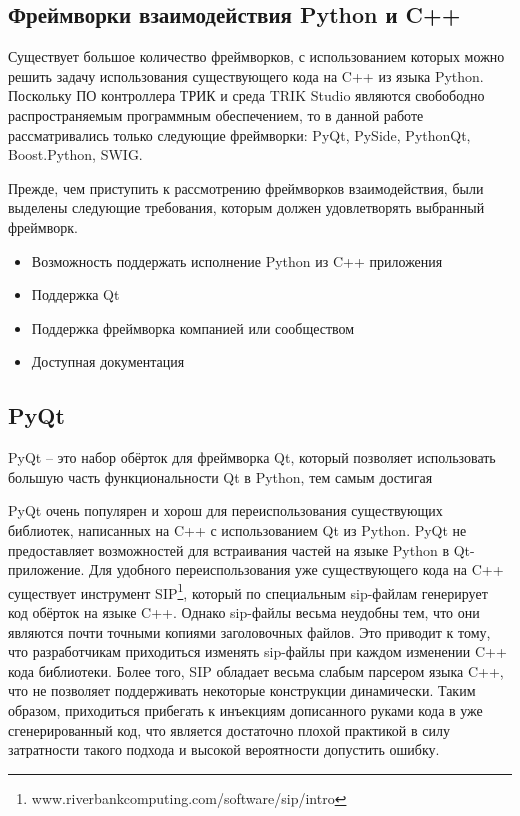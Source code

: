\documentclass[14pt]{matmex-diploma-custom}
\begin{document}
\subsection{Фреймворки взаимодействия Python и C++}


Существует большое количество фреймворков, с использованием которых можно решить задачу использования существующего кода на C++ из языка Python. Поскольку ПО контроллера ТРИК и среда TRIK Studio являются свобободно распространяемым программным обеспечением, то в данной работе рассматривались только следующие фреймворки: PyQt, PySide, PythonQt, Boost.Python, SWIG.

Прежде, чем приступить к рассмотрению фреймворков взаимодействия, были выделены следующие требования, которым должен удовлетворять выбранный фреймворк.

\begin{itemize}
    \item Возможность поддержать исполнение Python из C++ приложения
    \item Поддержка Qt
    \item Поддержка фреймворка компанией или сообществом
    \item Доступная документация
\end{itemize}

\subsection{PyQt}

PyQt \cite{pyqt} -- это набор обёрток для фреймворка Qt, который позволяет использовать большую часть функциональности Qt в Python, тем самым достигая 

PyQt очень популярен и хорош для переиспользования существующих библиотек, написанных на C++ с использованием Qt из Python. PyQt не предоставляет возможностей для встраивания частей на языке Python в Qt-приложение. Для удобного переиспользования уже существующего кода на C++ существует инструмент SIP\footnote{www.riverbankcomputing.com/software/sip/intro}, который по специальным sip-файлам генерирует код обёрток на языке C++. Однако sip-файлы весьма неудобны тем, что они являются почти точными копиями заголовочных файлов. Это приводит к тому, что разработчикам приходиться изменять sip-файлы при каждом изменении C++ кода библиотеки. Более того, SIP обладает весьма слабым парсером языка C++, что не позволяет поддерживать некоторые конструкции динамически. Таким образом, приходиться прибегать к инъекциям дописанного руками кода в уже сгенерированный код, что является достаточно плохой практикой в силу затратности такого подхода и высокой вероятности допустить ошибку.
\end{document}
